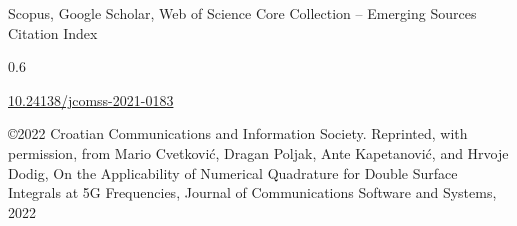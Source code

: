 \begin{description}[leftmargin=!,labelwidth=\widthof{\bfseries Volume and number}]
    \item[Databases] Scopus, Google Scholar, Web of Science Core Collection -- Emerging Sources Citation Index
    \item[Impact factor] 0.6
    \item[DOI] \href{https://doi.org/10.24138/jcomss-2021-0183}{\url{10.24138/jcomss-2021-0183}}
    \item[Copyright notice] \copyright 2022 Croatian Communications and Information Society. Reprinted, with permission, from Mario Cvetković, Dragan Poljak, Ante Kapetanović, and Hrvoje Dodig, On the Applicability of Numerical Quadrature for Double Surface Integrals at 5G Frequencies, Journal of Communications Software and Systems, 2022
\end{description}

\cleardoublepage


